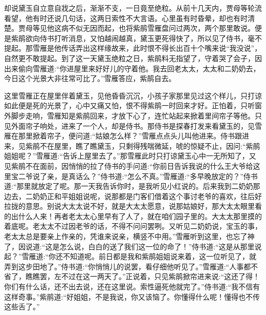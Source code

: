 

\begin{parag}
    却说黛玉自立意自戕之后，渐渐不支，一日竟至绝粒。从前十几天内，贾母等轮流看望，他有时还说几句话，这两日索性不大言语。心里虽有时昏晕，却也有时清楚。贾母等见他这病不似无因而起，也将紫鹃雪雁盘问过两次，两个那里敢说。便是紫鹃欲向侍书打听消息，又怕越闹越真，黛玉更死得快了，所以见了侍书，毫不提起。那雪雁是他传话弄出这样缘故来，此时恨不得长出百十个嘴来说“我没说”，自然更不敢提起。到了这一天黛玉绝粒之日，紫鹃料无指望了，守着哭了会子，因出来偷向雪雁道:“你进屋里来好好儿的守着他。我去回老太太，太太和二奶奶去，今日这个光景大非往常可比了。”雪雁答应，紫鹃自去。
\end{parag}


\begin{parag}
    这里雪雁正在屋里伴着黛玉，见他昏昏沉沉，小孩子家那里见过这个样儿，只打谅如此便是死的光景了，心中又痛又怕，恨不得紫鹃一时回来才好。正怕着，只听窗外脚步走响，雪雁知是紫鹃回来，才放下心了，连忙站起来掀着里间帘子等他。只见外面帘子响处，进来了一个人，却是侍书。那侍书是探春打发来看黛玉的，见雪雁在那里掀着帘子，便问道:“姑娘怎么样？”雪雁点点头儿叫他进来。侍书跟进来，见紫鹃不在屋里，瞧了瞧黛玉，只剩得残喘微延，唬的惊疑不止，因问:“紫鹃姐姐呢？”雪雁道:“告诉上屋里去了。”那雪雁此时只打谅黛玉心中一无所知了，又见紫鹃不在面前，因悄悄的拉了侍书的手问道:“你前日告诉我说的什么王大爷给这里宝二爷说了亲，是真话么？”侍书道:“怎么不真。”雪雁道:“多早晚放定的？”侍书道:“那里就放定了呢。那一天我告诉你时，是我听见小红说的。后来我到二奶奶那边去，二奶奶正和平姐姐说呢，说那都是门客们借着这个事讨老爷的喜欢，往后好拉拢的意思。别说大太太说不好，就是大太太愿意，说那姑娘好，那大太太眼里看的出什么人来！再者老太太心里早有了人了，就在咱们园子里的。大太太那里摸的着底呢。老太太不过因老爷的话，不得不问问罢咧。又听见二奶奶说，宝玉的事，老太太总是要亲上作亲的，凭谁来说亲，横竖不中用。”雪雁听到这里，也忘了神了，因说道:“这是怎么说，白白的送了我们这一位的命了！”侍书道:“这是从那里说起？”雪雁道:“你还不知道呢。前日都是我和紫鹃姐姐说来着，这一位听见了，就弄到这步田地了。”侍书道:“你悄悄儿的说罢，看仔细他听见了。”雪雁道:“人事都不省了，瞧瞧罢，左不过在这一两天了。”正说着，只见紫鹃掀帘进来说:“这还了得！你们有什么话，还不出去说，还在这里说。索性逼死他就完了。”侍书道:“我不信有这样奇事。”紫鹃道:“好姐姐，不是我说，你又该恼了。你懂得什么呢！懂得也不传这些舌了。”
\end{parag}


